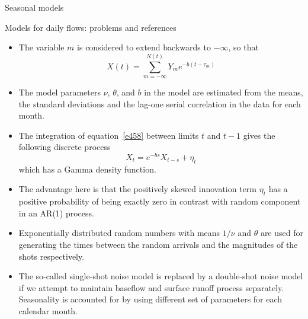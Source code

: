 \documentclass[8pt]{beamer}
\renewcommand{\emph}[1]{\textcolor{myorange}{#1}}
\begin{document}
\begin{frame}{Seasonal models}
    \begin{block}{Models for daily flows: problems and references}
    \end{block}
    \begin{itemize}
        \item The variable $m$ is considered to extend backwards to $-\infty$, so that
\begin{equation}
    X(t) = \sum_{m = -\infty}^{N(t)} Y_m e^{-b(t-\tau_m)}
        \label{e458}
    \end{equation}

\item The model parameters $\nu$, $\theta$, and $b$ in the model are estimated from the \emph{means}, the \emph{standard deviations} and the \emph{lag-one serial correlation} in the data for each month. 
\item The integration of equation~\ref{e458} between limits $t$ and $t-1$ gives the following discrete process
\begin{equation}
    X_t = e^{-bs} X_{t-s} + \eta_t
        \label{e459}
    \end{equation}
    which has a \emph{Gamma density function}. 
\item The advantage here is that the positively skewed \emph{innovation term} $\eta_t$ has a positive probability  of being exactly zero in contrast with random component in an \emph{AR(1)} process. 
\item Exponentially distributed \emph{random numbers}  with means $1/\nu$ and $\theta$ are used for generating the times between the \emph{random arrivals} and the magnitudes of the \emph{shots} respectively. 
\item The so-called \emph{single-shot noise model} is replaced by a \emph{double-shot noise model} if we attempt to maintain \emph{baseflow} and \emph{surface runoff} process separately. \emph{Seasonality} is accounted for by using different set of parameters for each calendar month.   
    \end{itemize}
\end{frame}
\end{document}
